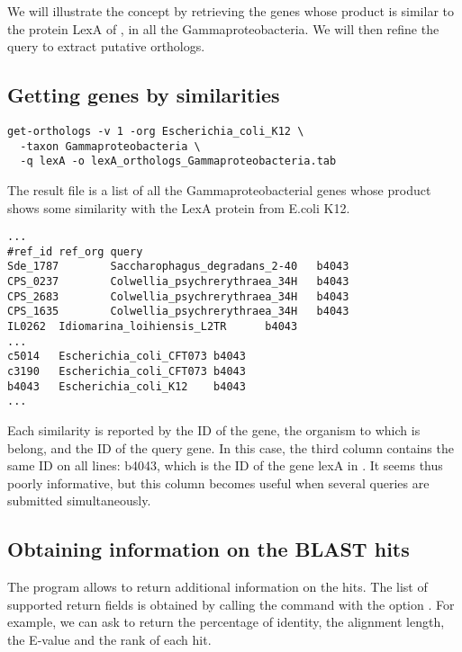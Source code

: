 We will illustrate the concept by retrieving the genes whose product
is similar to the protein LexA of , in
all the Gammaproteobacteria. We will then refine the query to extract
putative orthologs.

\subsection{Getting genes by similarities}

\begin{footnotesize}
\begin{verbatim}
get-orthologs -v 1 -org Escherichia_coli_K12 \
  -taxon Gammaproteobacteria \
  -q lexA -o lexA_orthologs_Gammaproteobacteria.tab
\end{verbatim}
\end{footnotesize}

The result file is a list of all the Gammaproteobacterial genes whose
product shows some similarity with the LexA protein from E.coli K12.  

\begin{scriptsize}
\begin{verbatim}
...
#ref_id ref_org query
Sde_1787        Saccharophagus_degradans_2-40   b4043
CPS_0237        Colwellia_psychrerythraea_34H   b4043
CPS_2683        Colwellia_psychrerythraea_34H   b4043
CPS_1635        Colwellia_psychrerythraea_34H   b4043
IL0262  Idiomarina_loihiensis_L2TR      b4043
...
c5014   Escherichia_coli_CFT073 b4043
c3190   Escherichia_coli_CFT073 b4043
b4043   Escherichia_coli_K12    b4043
...
\end{verbatim}
\end{scriptsize}

Each similarity is reported by the ID of the gene, the organism to
which is belong, and the ID of the query gene. In this case, the third
column contains the same ID on all lines: b4043, which is the ID of
the gene lexA in \org{Escherichia coli K12}. It seems thus poorly
informative, but this column becomes useful when several queries are
submitted simultaneously.

\subsection{Obtaining information on the BLAST hits}

The program  allows to return additional
information on the hits. The list of supported return fields is
obtained by calling the command with the option \option{-help}. For
example, we can ask to return the percentage of identity, the
alignment length, the E-value and the rank of each hit.

